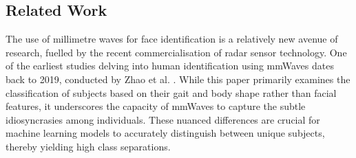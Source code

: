 \documentclass{mpaper}
\begin{document}
\vspace{0.05cm}
\subsection{Related Work}
The use of millimetre waves for face identification is a relatively new avenue of research, fuelled by the recent commercialisation of radar sensor technology. One of the earliest studies delving into human identification using mmWaves dates back to 2019, conducted by Zhao et al. \cite{zhao2019mid}. While this paper primarily examines the classification of subjects based on their gait and body shape rather than facial features, it underscores the capacity of mmWaves to capture the subtle idiosyncrasies among individuals. These nuanced differences are crucial for machine learning models to accurately distinguish between unique subjects, thereby yielding high class separations.
\end{document}
